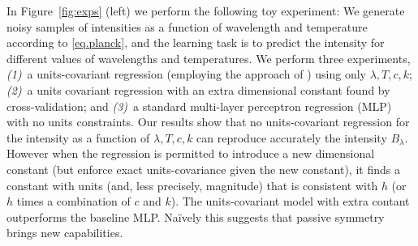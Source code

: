 \documentclass{article} %
\newcommand{\figref}[1]{Figure~\ref{#1}}
\begin{document}
In \figref{fig:exps} (left) we perform the following toy experiment:
We generate noisy samples of intensities as a function of wavelength and temperature according to \eqref{eq.planck}, and the learning task is to predict the intensity for different values of wavelengths and temperatures.
We perform three experiments,
\textsl{(1)}~a units-covariant regression (employing the approach of \citealt{villar2022dimensionless}) using only $\lambda, T, c, k$; \textsl{(2)}~a units covariant regression with an extra dimensional constant found by cross-validation; and \textsl{(3)}~a standard multi-layer perceptron regression (MLP) with no units constraints.
Our results show that no units-covariant regression for the intensity as a function of $\lambda, T, c, k$ can reproduce accurately the intensity $B_\lambda$.
However when the regression is permitted to introduce a new dimensional constant (but enforce exact units-covariance given the new constant), it finds a constant with units (and, less precisely, magnitude) that is consistent with $h$ (or $h$ times a combination of $c$ and $k$).
The units-covariant model with extra contant outperforms the baseline MLP.
Na\"ively this suggests that passive symmetry brings new capabilities.
\end{document}
